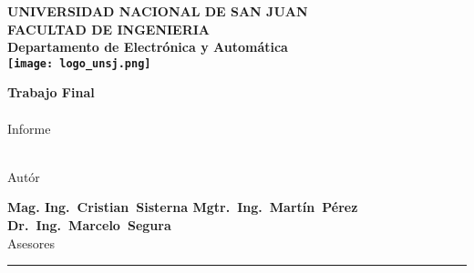 \begin{titlepage}
  \begin{center}
    \begin{Large}
      \textbf{UNIVERSIDAD NACIONAL DE SAN JUAN\\
      \vspace*{0.05in}
      FACULTAD DE INGENIERIA\\
      \vspace*{0.05in}
      Departamento de Electrónica y Automática\\
      \vspace*{0.2in}
      \texttt{[image: logo\_unsj.png]}\\
      \vspace*{\fill}}
    \end{Large}
    \begin{Large}
      \textbf{Trabajo Final\\\MakeUppercase{\thetitle}} \\
      Informe\\
    \end{Large}
    \vspace*{\fill}
    \begin{large}
      \textbf{\theauthor}\\
      Autór\\
    \end{large}
    \vspace*{0.5in}
    \begin{large}
      \textbf{Mag. Ing.~Cristian~Sisterna \hspace*{\fill}
      Mgtr.~Ing.~Martín~Pérez \hspace*{\fill}\\ Dr.~Ing.~Marcelo~Segura \\}
      Asesores\\
    \end{large}
    \vspace{\fill}
    \rule{80mm}{0.1mm}\\
    \vspace{.1in}
    \the\year
  \end{center}

\end{titlepage}
